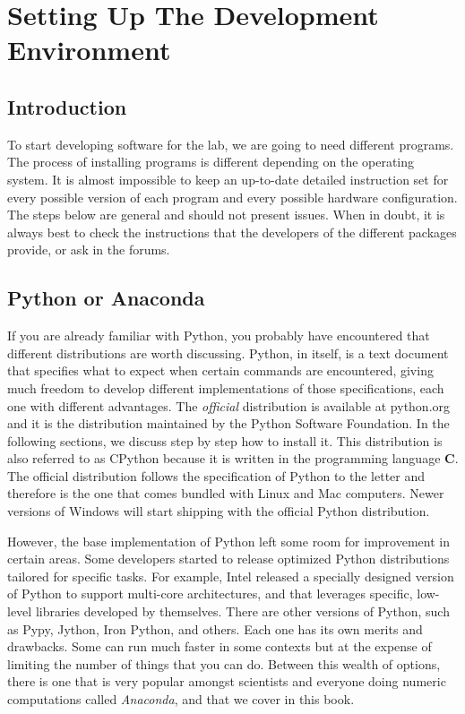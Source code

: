 \chapter[Setting Up]{Setting Up The Development Environment}\label{ch:setting-up}
\section{Introduction}\label{sec:setting-up-introduction}
To start developing software for the lab, we are going to need different programs. The process of installing programs is different depending on the operating system. It is almost impossible to keep an up-to-date detailed instruction set for every possible version of each program and every possible hardware configuration. The steps below are general and should not present issues. When in doubt, it is always best to check the instructions that the developers of the different packages provide, or ask in the forums.

\section{Python or Anaconda}\label{sec:python-or-anaconda}
If you are already familiar with Python, you probably have encountered that different distributions are worth discussing. Python, in itself, is a text document that specifies what to expect when certain commands are encountered, giving much freedom to develop different implementations of those specifications, each one with different advantages. The \emph{official} distribution is available at python.org and it is the distribution maintained by the Python Software Foundation. In the following sections, we discuss step by step how to install it. This distribution is also referred to as CPython because it is written in the programming language \textbf{C}. The official distribution follows the specification of Python to the letter and therefore is the one that comes bundled with Linux and Mac computers. Newer versions of Windows will start shipping with the official Python distribution.

However, the base implementation of Python left some room for improvement in certain areas. Some developers started to release optimized Python distributions tailored for specific tasks. For example, Intel released a specially designed version of Python to support multi-core architectures, and that leverages specific, low-level libraries developed by themselves. There are other versions of Python, such as Pypy, Jython, Iron Python, and others. Each one has its own merits and drawbacks. Some can run much faster in some contexts but at the expense of limiting the number of things that you can do. Between this wealth of options, there is one that is very popular amongst scientists and everyone doing numeric computations called \emph{Anaconda}, and that we cover in this book.

